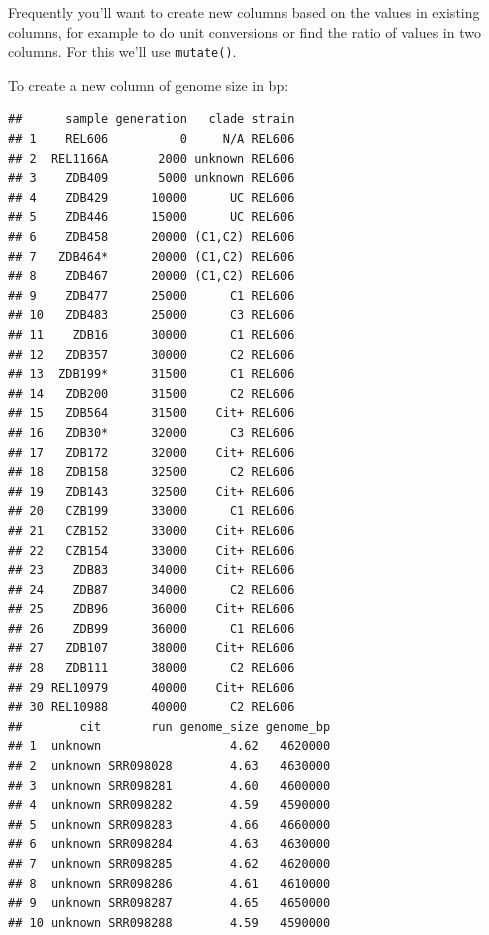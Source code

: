 \documentclass[]{book}
\newenvironment{Shaded}{\begin{snugshade}}{\end{snugshade}}
\newcommand{\DataTypeTok}[1]{\textcolor[rgb]{0.13,0.29,0.53}{#1}}
\newcommand{\FloatTok}[1]{\textcolor[rgb]{0.00,0.00,0.81}{#1}}
\newcommand{\KeywordTok}[1]{\textcolor[rgb]{0.13,0.29,0.53}{\textbf{#1}}}
\newcommand{\NormalTok}[1]{#1}
\newcommand{\OperatorTok}[1]{\textcolor[rgb]{0.81,0.36,0.00}{\textbf{#1}}}
\newcommand{\StringTok}[1]{\textcolor[rgb]{0.31,0.60,0.02}{#1}}
\begin{document}
Frequently you'll want to create new columns based on the values in existing columns, for example to do unit conversions or find the ratio of values in two columns. For this we'll use \texttt{mutate()}.

To create a new column of genome size in bp:

\begin{Shaded}
\end{Shaded}

\begin{verbatim}
##      sample generation   clade strain
## 1    REL606          0     N/A REL606
## 2  REL1166A       2000 unknown REL606
## 3    ZDB409       5000 unknown REL606
## 4    ZDB429      10000      UC REL606
## 5    ZDB446      15000      UC REL606
## 6    ZDB458      20000 (C1,C2) REL606
## 7   ZDB464*      20000 (C1,C2) REL606
## 8    ZDB467      20000 (C1,C2) REL606
## 9    ZDB477      25000      C1 REL606
## 10   ZDB483      25000      C3 REL606
## 11    ZDB16      30000      C1 REL606
## 12   ZDB357      30000      C2 REL606
## 13  ZDB199*      31500      C1 REL606
## 14   ZDB200      31500      C2 REL606
## 15   ZDB564      31500    Cit+ REL606
## 16   ZDB30*      32000      C3 REL606
## 17   ZDB172      32000    Cit+ REL606
## 18   ZDB158      32500      C2 REL606
## 19   ZDB143      32500    Cit+ REL606
## 20   CZB199      33000      C1 REL606
## 21   CZB152      33000    Cit+ REL606
## 22   CZB154      33000    Cit+ REL606
## 23    ZDB83      34000    Cit+ REL606
## 24    ZDB87      34000      C2 REL606
## 25    ZDB96      36000    Cit+ REL606
## 26    ZDB99      36000      C1 REL606
## 27   ZDB107      38000    Cit+ REL606
## 28   ZDB111      38000      C2 REL606
## 29 REL10979      40000    Cit+ REL606
## 30 REL10988      40000      C2 REL606
##        cit       run genome_size genome_bp
## 1  unknown                  4.62   4620000
## 2  unknown SRR098028        4.63   4630000
## 3  unknown SRR098281        4.60   4600000
## 4  unknown SRR098282        4.59   4590000
## 5  unknown SRR098283        4.66   4660000
## 6  unknown SRR098284        4.63   4630000
## 7  unknown SRR098285        4.62   4620000
## 8  unknown SRR098286        4.61   4610000
## 9  unknown SRR098287        4.65   4650000
## 10 unknown SRR098288        4.59   4590000

\end{verbatim}
\end{document}

